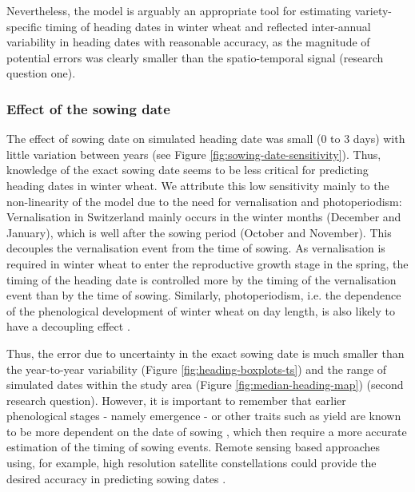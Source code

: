 Nevertheless, the model is arguably an appropriate tool for estimating variety-specific timing of heading dates in winter wheat and reflected inter-annual variability in heading dates with reasonable accuracy, as the magnitude of potential errors was clearly smaller than the spatio-temporal signal (research question one).

\subsubsection{Effect of the sowing date}
The effect of sowing date on simulated heading date was small (0 to 3 days) with little variation between years (see Figure \ref{fig:sowing-date-sensitivity}). Thus, knowledge of the exact sowing date seems to be less critical for predicting heading dates in winter wheat. We attribute this low sensitivity mainly to the non-linearity of the model due to the need for vernalisation and photoperiodism: Vernalisation in Switzerland mainly occurs in the winter months (December and January), which is well after the sowing period (October and November). This decouples the vernalisation event from the time of sowing. As vernalisation is required in winter wheat to enter the reproductive growth stage in the spring, the timing of the heading date is controlled more by the timing of the vernalisation event than by the time of sowing. Similarly, photoperiodism, i.e. the dependence of the phenological development of winter wheat on day length, is also likely to have a decoupling effect \cite{fedorov_photoperiodism_1976}.

Thus, the error due to uncertainty in the exact sowing date is much smaller than the year-to-year variability (Figure \ref{fig:heading-boxplots-ts}) and the range of simulated dates within the study area (Figure \ref{fig:median-heading-map}) (second research question). However, it is important to remember that earlier phenological stages - namely emergence - or other traits such as yield are known to be more dependent on the date of sowing \citep{ceglar_improving_2019, dueri_simulation_2022}, which then require a more accurate estimation of the timing of sowing events. Remote sensing based approaches using, for example, high resolution satellite constellations could provide the desired accuracy in predicting sowing dates \citep{sadeh_sowing_2019}.

